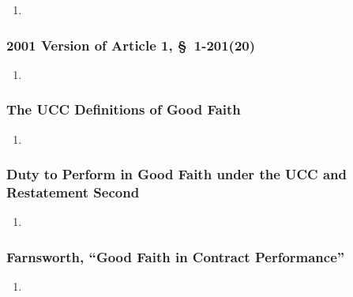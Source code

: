\begin{enumerate}
    \item %
\end{enumerate}

\subsubsection{2001 Version of Article 1, \S\ 1-201(20)}

\begin{enumerate}
    \item %
\end{enumerate}

\subsubsection{The UCC Definitions of Good Faith}

\begin{enumerate}
    \item %
\end{enumerate}

\subsubsection{Duty to Perform in Good Faith under the UCC and Restatement 
Second}

\begin{enumerate}
    \item %
\end{enumerate}

\subsubsection{Farnsworth, ``Good Faith in Contract Performance''}

\begin{enumerate}
    \item %
\end{enumerate}
